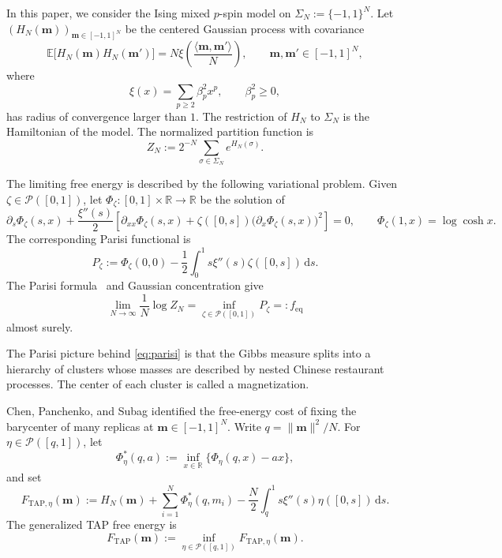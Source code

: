 \documentclass[a4paper,10pt,reqno]{amsart}
\numberwithin{equation}{section}
\newcommand{\dR}{\mathbb{R}}%
\newcommand{\dE}{\mathbb{E}}%
\newcommand{\mc}{\mathcal}
\newcommand{\dd}{\mathrm{d}}
\newcommand{\TAP}{\mathrm{TAP}}
\newcommand{\eq}{\mathrm{eq}}
\newcommand{\bfm}{\mathbf{m}}
\begin{document}
	In this paper, we consider the Ising mixed $p$-spin model on
	\(\Sigma_N:=\{-1,1\}^N\). Let
	\((H_N(\bfm))_{\bfm\in[-1,1]^N}\) be the centered Gaussian process with
	covariance
	\[
	\dE\bigl[H_N(\bfm)H_N(\bfm')\bigr]
	=
	N\xi\!\left(\frac{\langle\bfm,\bfm'\rangle}{N}\right),
	\qquad \bfm,\bfm'\in[-1,1]^N,
	\]
	where
	\begin{equation}\label{eq:mixture-assumption}
		\xi(x)=\sum_{p\ge2}\beta_p^2x^p,
		\qquad \beta_p^2\ge0,
	\end{equation}
	has radius of convergence larger than $1$. The restriction of \(H_N\) to
	\(\Sigma_N\) is the Hamiltonian of the model. The normalized partition
	function is
	\begin{equation}\label{eq:normalized-partition-function}
		Z_N:=2^{-N}\sum_{\sigma\in\Sigma_N}e^{H_N(\sigma)}.
	\end{equation}
	
	The limiting free energy is described by the following variational problem.
	Given $\zeta\in\mc P([0,1])$, let
	$\Phi_\zeta:[0,1]\times\dR\to\dR$ be the solution of
	\begin{equation}\label{eq:parisi-pde}
		\partial_s\Phi_\zeta(s,x)
		+
		\frac{\xi''(s)}2
		\left[
		\partial_{xx}\Phi_\zeta(s,x)
		+
		\zeta([0,s])\bigl(\partial_x\Phi_\zeta(s,x)\bigr)^2
		\right]
		=0,
		\qquad
		\Phi_\zeta(1,x)=\log\cosh x.
	\end{equation}
	The corresponding Parisi functional is
	\begin{equation}\label{eq:parisi-value}
		P_\zeta
		:=
		\Phi_\zeta(0,0)
		-
		\frac12\int_0^1s\xi''(s)\zeta([0,s])\,\dd s.
	\end{equation}
	The Parisi formula~\cite[Theorem~3.1]{PanchenkoBook} and Gaussian
	concentration give
	\begin{equation}\label{eq:parisi}
		\lim_{N\to\infty}\frac1N\log Z_N
		=
		\inf_{\zeta\in\mc P([0,1])}P_\zeta
		=:
		f_{\eq}
	\end{equation}
	almost surely.
	
	The Parisi picture behind \eqref{eq:parisi} is that the Gibbs measure splits
	into a hierarchy of clusters whose masses are described by nested Chinese
	restaurant processes. The center of each cluster is called a magnetization.
	
	Chen, Panchenko, and Subag
	\cite[Theorems~1 and~2]{ChenPanchenkoSubag} identified the free-energy
	cost of fixing the barycenter of many replicas at
	\(\bfm\in[-1,1]^N\). Write \(q=\|\bfm\|^2/N\). For
	\(\eta\in\mc P([q,1])\), let
	\[
	\Phi_\eta^*(q,a)
	:=
	\inf_{x\in\dR}\{\Phi_\eta(q,x)-ax\},
	\]
	and set
	\begin{equation}\label{eq:FTAP-eta}
		F_{\TAP,\eta}(\bfm)
		:=
		H_N(\bfm)
		+
		\sum_{i=1}^N\Phi_\eta^*(q,m_i)
		-
		\frac N2\int_q^1s\xi''(s)\eta([0,s])\,\dd s.
	\end{equation}
	The generalized TAP free energy is
	\begin{equation}\label{eq:FTAP}
		F_{\TAP}(\bfm)
		:=
		\inf_{\eta\in\mc P([q,1])}F_{\TAP,\eta}(\bfm).
	\end{equation}
	
\end{document}
